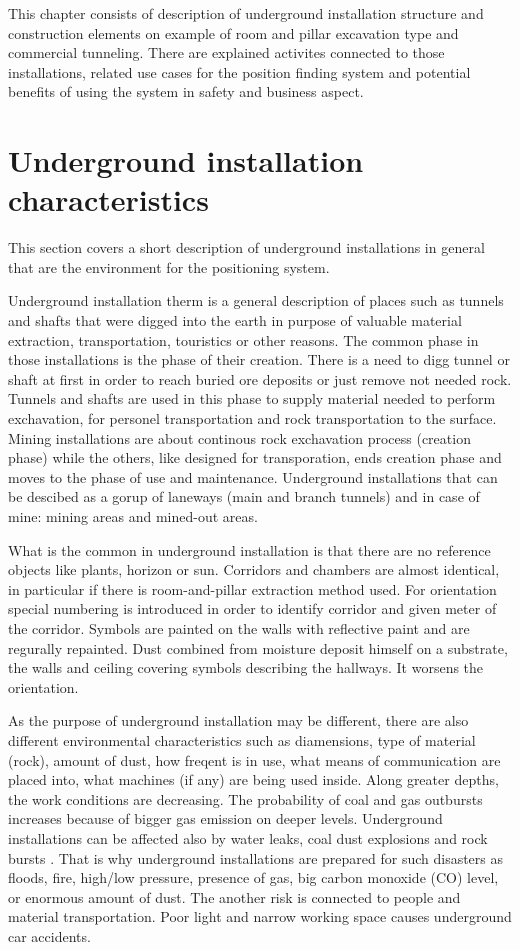 \documentclass[../main.tex]{subfiles}
\begin{document}
This chapter consists of description of underground installation structure and construction elements on example of room and pillar excavation type and commercial tunneling. There are explained activites connected to those installations, related use cases for the position finding system and potential benefits of using the system in safety and business aspect.

\section{Underground installation characteristics}

This section covers a short description of underground installations in general that are the environment for the positioning system.

Underground installation therm is a general description of places such as tunnels and shafts that were digged into the earth in purpose of valuable material extraction, transportation, touristics or other reasons. The common phase in those installations is the phase of their creation. There is a need to digg tunnel or shaft at first in order to reach buried ore deposits or just remove not needed rock. Tunnels and shafts are used in this phase to supply material needed to perform exchavation, for personel transportation and rock transportation to the surface. Mining installations are about continous rock exchavation process (creation phase) while the others, like designed for transporation, ends creation phase and moves to the phase of use and maintenance. Underground installations that can be descibed as a gorup of laneways (main and branch tunnels) and in case of mine: mining areas and mined-out areas.

What is the common in underground installation is that there are no reference objects like plants, horizon or sun. Corridors and chambers are almost identical, in particular if there is room-and-pillar extraction method used. For orientation special numbering is introduced in order to identify corridor and given meter of the corridor. Symbols are painted on the walls with reflective paint and are regurally repainted. Dust combined from moisture deposit himself on a substrate, the walls and ceiling covering symbols describing the hallways. It worsens the orientation.

As the purpose of underground installation may be different, there are also different environmental characteristics such as diamensions, type of material (rock), amount of dust, how freqent is in use, what means of communication are placed into, what machines (if any) are being used inside. Along greater depths, the work conditions are decreasing. The probability of coal and gas outbursts increases because of bigger gas emission on deeper levels. Underground installations can be affected also by water leaks, coal dust explosions and rock bursts \cite{WSN_monitoring}. That is why underground installations are prepared for such disasters as floods, fire, high/low pressure, presence of gas, big carbon monoxide (CO) level, or enormous amount of dust. The another risk is connected to people and material transportation. Poor light and narrow working space causes underground car accidents.
\end{document}

